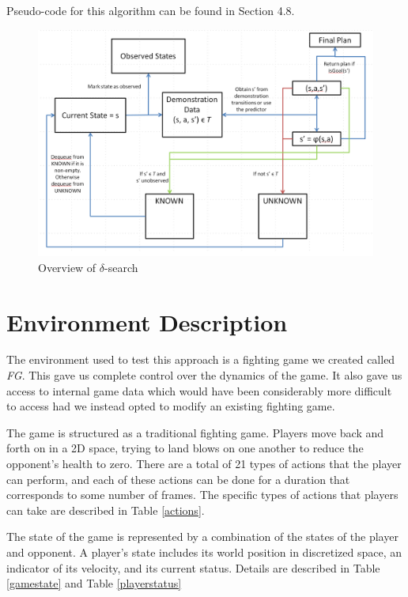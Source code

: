 Pseudo-code for this algorithm can be found in Section 4.8.

\begin{figure}[t]
	\centering
	\includegraphics[width=\textwidth]{Figures/SearchSpecificFlowchart.png}
	\caption{Overview of $\delta$-search}
	\label{}
\end{figure}

\section{Environment Description}
The environment used to test this approach is a fighting game we created called \textit{FG}. This gave us complete control over the dynamics of the game. It also gave us access to internal game data which would have been considerably more difficult to access had we instead opted to modify an existing fighting game. 

The game is structured as a traditional fighting game. Players move back and forth on in a 2D space, trying to land blows on one another to reduce the opponent's health to zero. There are a total of 21 types of actions that the player can perform, and each of these actions can be done for a duration that corresponds to some number of frames. The specific types of actions that players can take are described in Table \ref{actions}.

The state of the game is represented by a combination of the states of the player and opponent. A player's state includes its world position in discretized space, an indicator of its velocity, and its current status. Details are described in Table \ref{gamestate} and Table \ref{playerstatus}




